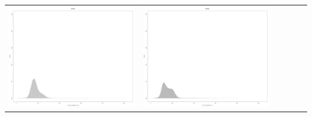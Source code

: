 \begin{table}[htbp]
{\begin{tabular}{l | ccccc}
\begin{minipage}{.15\textwidth}
     			 	\includegraphics[width=\linewidth]{images/mema-dens-graph/N4}
    				 \end{minipage}
    			   &	 \begin{minipage}{.15\textwidth}
     			 	\includegraphics[width=\linewidth]{images/mema-dens-graph/N8}
    				 \end{minipage}
    			   &	 \begin{minipage}{.15\textwidth}

\end{minipage}
\end{tabular}}
\end{table}
